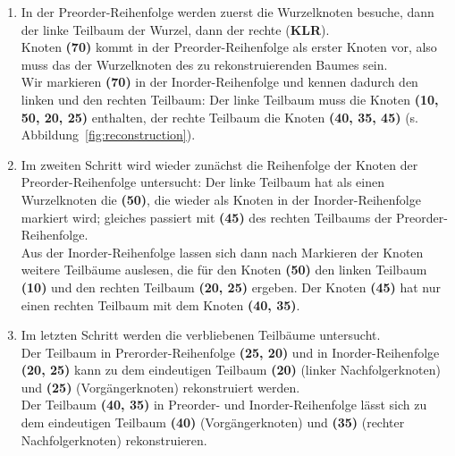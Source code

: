 \begin{enumerate}
    \item In der Preorder-Reihenfolge werden zuerst die Wurzelknoten besuche, dann der linke Teilbaum der Wurzel, dann der rechte (\textbf{KLR}).\\
    Knoten \textbf{(70)} kommt in der Preorder-Reihenfolge als erster Knoten vor, also muss das der Wurzelknoten des zu rekonstruierenden Baumes sein.\\
    Wir markieren \textbf{(70)} in der Inorder-Reihenfolge und kennen dadurch den linken und den rechten Teilbaum: Der linke Teilbaum muss die Knoten \textbf{(10, 50, 20, 25)} enthalten, der rechte Teilbaum die Knoten \textbf{(40, 35, 45)} (s. Abbildung~\ref{fig:reconstruction}).
    \item Im zweiten Schritt wird wieder zunächst die Reihenfolge der Knoten der Preorder-Reihenfolge untersucht: Der linke Teilbaum hat als einen Wurzelknoten die \textbf{(50)}, die wieder als Knoten in der Inorder-Reihenfolge markiert wird; gleiches passiert mit \textbf{(45)} des rechten Teilbaums der Preorder-Reihenfolge.\\
    Aus der Inorder-Reihenfolge lassen sich dann nach Markieren der Knoten weitere Teilbäume auslesen, die für den Knoten \textbf{(50)} den linken Teilbaum \textbf{(10)} und den rechten Teilbaum \textbf{(20, 25)} ergeben.
    Der Knoten \textbf{(45)} hat nur einen rechten Teilbaum mit dem Knoten \textbf{(40, 35)}.
    \item Im letzten Schritt werden die verbliebenen Teilbäume untersucht.\\
    Der Teilbaum in Prerorder-Reihenfolge \textbf{(25, 20)} und in Inorder-Reihenfolge \textbf{(20, 25)} kann zu dem eindeutigen Teilbaum \textbf{(20)} (linker Nachfolgerknoten) und \textbf{(25)} (Vorgängerknoten) rekonstruiert werden.\\
    Der Teilbaum \textbf{(40, 35)} in Preorder- und Inorder-Reihenfolge lässt sich zu dem eindeutigen Teilbaum \textbf{(40)} (Vorgängerknoten) und \textbf{(35)} (rechter Nachfolgerknoten) rekonstruieren.
\end{enumerate}

